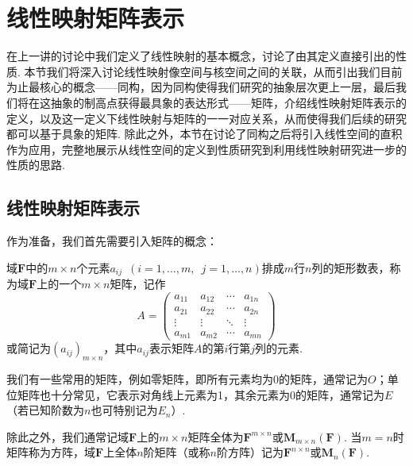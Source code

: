 \chapter{线性映射矩阵表示}

在上一讲的讨论中我们定义了线性映射的基本概念，讨论了由其定义直接引出的性质. 本节我们将深入讨论线性映射像空间与核空间之间的关联，从而引出我们目前为止最核心的概念——同构，因为同构使得我们研究的抽象层次更上一层，最后我们将在这抽象的制高点获得最具象的表达形式——矩阵，介绍线性映射矩阵表示的定义，以及这一定义下线性映射与矩阵的一一对应关系，从而使得我们后续的研究都可以基于具象的矩阵. 除此之外，本节在讨论了同构之后将引入线性空间的直积作为应用，完整地展示从线性空间的定义到性质研究到利用线性映射研究进一步的性质的思路.

\section{线性映射矩阵表示}

作为准备，我们首先需要引入矩阵的概念：
\begin{definition}{}{}
    域$\mathbf{F}$中的$m\times n$个元素$a_{ij}\enspace(i=1,\ldots,m,\enspace j=1,\ldots,n)$排成$m$行$n$列的矩形数表，称为域$\mathbf{F}$上的一个$m\times n$矩阵，记作
    \[A=\begin{pmatrix}
            a_{11} & a_{12} & \cdots & a_{1n} \\
            a_{21} & a_{22} & \cdots & a_{2n} \\
            \vdots & \vdots & \ddots & \vdots \\
            a_{m1} & a_{m2} & \cdots & a_{mn}
        \end{pmatrix}\]
    或简记为$(a_{ij})_{m\times n}$，其中$a_{ij}$表示矩阵$A$的第$i$行第$j$列的元素.
\end{definition}

我们有一些常用的矩阵，例如零矩阵，即所有元素均为0的矩阵，通常记为$O$；单位矩阵也十分常见，它表示对角线上元素为1，其余元素为0的矩阵，通常记为$E$（若已知阶数为$n$也可特别记为$E_n$）.

除此之外，我们通常记域$\mathbf{F}$上的$m\times n$矩阵全体为$\mathbf{F}^{m\times n}$或$\mathbf{M}_{m\times n}(\mathbf{F})$. 当$m=n$时矩阵称为方阵，域$\mathbf{F}$上全体$n$阶矩阵（或称$n$阶方阵）记为$\mathbf{F}^{n\times n}$或$\mathbf{M}_n(\mathbf{F})$.

